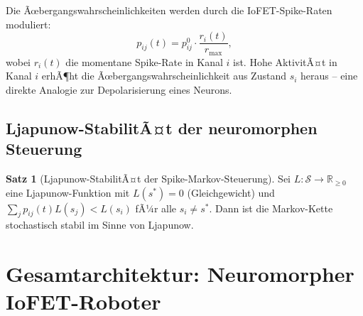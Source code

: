 ﻿\documentclass[a4paper,12pt]{scrreprt}
\theoremstyle{definition}
\newtheorem{satz}{Satz}[section]
\begin{document}
Die Ãœbergangswahrscheinlichkeiten werden durch die IoFET-Spike-Raten
moduliert:
\[
  p_{ij}(t) = p_{ij}^0 \cdot \frac{r_i(t)}{r_{\max}},
\]
wobei $r_i(t)$ die momentane Spike-Rate in Kanal $i$ ist. Hohe
AktivitÃ¤t in Kanal $i$ erhÃ¶ht die Ãœbergangswahrscheinlichkeit aus
Zustand $s_i$ heraus -- eine direkte Analogie zur Depolarisierung
eines Neurons.

\subsection{Ljapunow-StabilitÃ¤t der neuromorphen Steuerung}

\begin{satz}[Ljapunow-StabilitÃ¤t der Spike-Markov-Steuerung]
  Sei $L: \mathcal{S} \to \mathbb{R}_{\geq 0}$ eine Ljapunow-Funktion
  mit $L(s^*) = 0$ (Gleichgewicht) und
  $\sum_j p_{ij}(t) L(s_j) < L(s_i)$ fÃ¼r alle $s_i \neq s^*$.
  Dann ist die Markov-Kette stochastisch stabil im Sinne von
  Ljapunow.
\end{satz}

\section{Gesamtarchitektur: Neuromorpher IoFET-Roboter}
\end{document}
